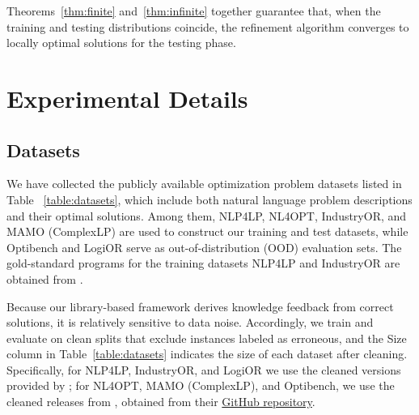 \documentclass[sigconf, nonacm]{acmart}
\begin{document}
Theorems~\ref{thm:finite} and~\ref{thm:infinite} together guarantee that, when the training and testing distributions coincide, the refinement algorithm converges to locally optimal solutions for the testing phase.



\section{Experimental Details}

\subsection{Datasets\label{appendix:datasets}}

We have collected the publicly available optimization problem datasets listed in Table ~\ref{table:datasets}, which include both natural language problem descriptions and their optimal solutions. Among them, NLP4LP, NL4OPT, IndustryOR, and MAMO (ComplexLP) are used to construct our training and test datasets, while Optibench and LogiOR serve as out-of-distribution (OOD) evaluation sets. The gold-standard programs for the training datasets NLP4LP and IndustryOR are obtained from \citet{yang2025orthought}.

Because our library-based framework derives knowledge feedback from correct solutions, it is relatively sensitive to data noise. Accordingly, we train and evaluate on clean splits that exclude instances labeled as erroneous, and the Size column in Table~\ref{table:datasets} indicates the size of each dataset after cleaning. Specifically, for NLP4LP, IndustryOR, and LogiOR we use the cleaned versions provided by \citet{yang2025orthought}; for NL4OPT, MAMO (ComplexLP), and Optibench, we use the cleaned releases from \citet{astorga2025autoformulation}, obtained from their \href{https://github.com/LLM4OR/LLM4OR}{GitHub repository}.
\end{document}
